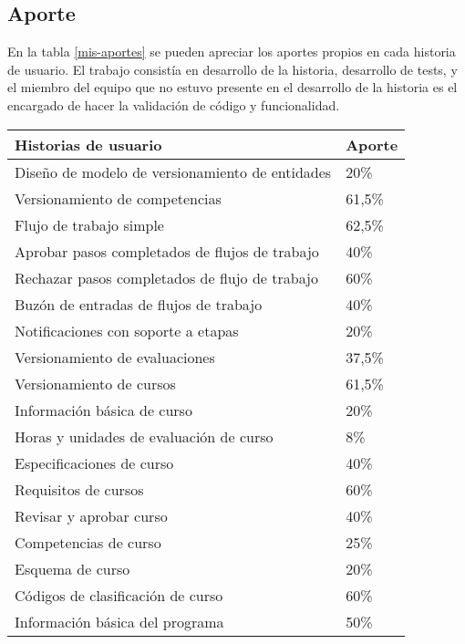 \subsection{Aporte}
En la tabla \ref{mis-aportes} se pueden apreciar los aportes propios en cada historia de usuario. El trabajo consistía en desarrollo de la historia, desarrollo de tests, y el miembro del equipo que no estuvo presente en el desarrollo de la historia es el encargado de hacer la validación de código y funcionalidad.

\begin{table}[H]
\centering
\small
\begin{tabular}{@{}ll@{}}
\toprule
Historias de usuario                                & Aporte \\ \midrule
Diseño de modelo de versionamiento de entidades     &  20\%  \\
Versionamiento de competencias                      & 61,5\% \\
Flujo de trabajo simple                             & 62,5\% \\
Aprobar pasos completados de flujos de trabajo      &  40\%  \\
Rechazar pasos completados de flujo de trabajo      &  60\%  \\
Buzón de entradas de flujos de trabajo              &  40\%  \\
Notificaciones con soporte a etapas                 &  20\%  \\
Versionamiento de evaluaciones                      & 37,5\% \\
Versionamiento de cursos                            & 61,5\% \\
Información básica de curso                         &  20\%  \\
Horas y unidades de evaluación de curso             &   8\%  \\
Especificaciones de curso                           &  40\%  \\
Requisitos de cursos                                &  60\%  \\
Revisar y aprobar curso                             &  40\%  \\
Competencias de curso                               &  25\%  \\
Esquema de curso                                    &  20\%  \\
Códigos de clasificación de curso                   &  60\%  \\
Información básica del programa                     &  50\%  \\

\end{tabular}
\end{table}
